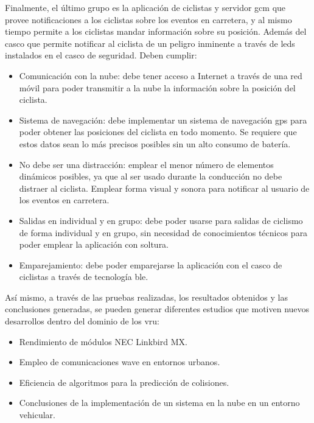 Finalmente, el último grupo es la aplicación de ciclistas y servidor \gls{gcm}
que provee notificaciones a los ciclistas sobre los eventos en carretera, y al
mismo tiempo permite a los ciclistas mandar información sobre su posición.
Además del casco  que permite notificar al ciclista de un peligro
inminente a través de leds instalados en el casco de seguridad. Deben cumplir:
\begin{itemize}
	\item Comunicación con la nube: debe tener acceso a Internet a través de una
	red móvil para poder transmitir a la nube la información sobre la posición
	del ciclista.

	\item Sistema de navegación: debe implementar un sistema de navegación
	\gls{gps} para poder obtener las posiciones del ciclista en todo momento. Se
	requiere que estos datos sean lo más precisos posibles sin un alto consumo de
	batería.

	\item No debe ser una distracción: emplear el menor número de elementos
	dinámicos posibles, ya que al ser usado durante la conducción no debe
	distraer al ciclista. Emplear forma visual y sonora para notificar al usuario
	de los eventos en carretera.

	\item Salidas en individual y en grupo: debe poder usarse para salidas de
	ciclismo de forma individual y en grupo, sin necesidad de conocimientos
	técnicos para poder emplear la aplicación con soltura.

	\item Emparejamiento: debe poder emparejarse la aplicación con el casco de
	ciclistas a través de tecnología \gls{ble}.
\end{itemize}

Así mismo, a través de las pruebas realizadas, los resultados obtenidos y las
conclusiones generadas, se pueden generar diferentes estudios que motiven
nuevos desarrollos dentro del dominio de los \gls{vru}:
\begin{itemize}
	\item Rendimiento de módulos NEC Linkbird MX.

	\item Empleo de comunicaciones \gls{wave} en entornos urbanos.

	\item Eficiencia de algoritmos para la predicción de colisiones.

	\item Conclusiones de la implementación de un sistema en la nube en un
	entorno vehicular.
\end{itemize}
